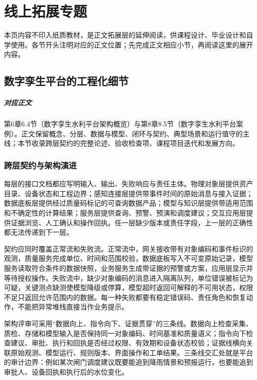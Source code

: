 \chapter{线上拓展专题}
\label{online:topics}

本页内容不印入纸质教材，是正文拓展层的延伸阅读，供课程设计、毕业设计和自学使用。各节开头注明对应的正文位置；先完成正文相应小节，再阅读这里的展开内容。

\section{数字孪生平台的工程化细节}\label{online:twin}

\paragraph{对应正文}第6章6.4节（数字孪生水利平台架构概览）与第8章8.5节（数字孪生水利平台案例）。正文保留概念、分层、数据与模型、闭环与契约、典型场景和运行值守的主线；本节收录跨层契约的完整论述、验收检查项、课程项目迭代和发展方向。

\subsection{跨层契约与架构演进}

每层的接口文档都应写明输入、输出、失败响应与责任主体。物理对象层提供资产目录、设备状态和工程边界；感知连接层提供带事件时间的原始消息与接入证据；数据底板层提供经过质量码标记的可查询数据产品；模型与知识层提供带适用范围和不确定性的计算结果；服务层提供查询、预警、预演和调度建议；交互应用层提供证据浏览、人工确认和操作回执。任一层缺少版本或责任字段，上一层的正确性都无法传递到下一层。

契约应同时覆盖正常流和失败流。正常流中，网关接收带有对象编码和事件标识的观测，质量服务完成单位、时间和范围校验，数据底板写入不可变原始记录，模型服务读取符合条件的数据快照，业务服务生成带证据的预警或方案，应用层显示并等待授权操作。失败流中，缺少对象编码的消息进入隔离队列，单位错误被标记为可疑，关键测点缺测使模型降级或停算，模型超时返回可解释的不可用状态，权限不足只返回允许范围内的数据。每一种失败都要有稳定错误码、责任角色和恢复动作，不能把异常堆栈直接当作业务提示。

架构评审可采用“数据向上、指令向下、证据贯穿”的三条线。数据向上检查采集、质检、存储和模型输入是否保持同一对象编码、时间基准和质量语义；指令向下检查建议、审批、执行和回执是否经过权限、有效期和设备状态校验；证据线横向关联原始观测、模型运行、规则版本、界面操作和工单结果。三条线交汇处就是平台的审计边界：例如某次闸门调度建议既要能追到降雨情景和预报运行，也要能追到审批人、设备回执和执行后的水位变化。

